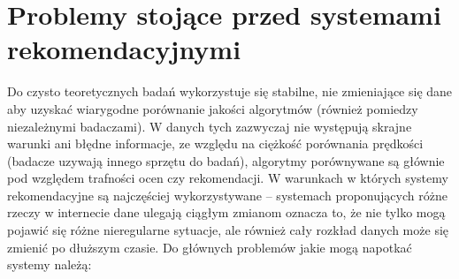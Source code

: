 \documentclass{pracamgr}
\begin{document}
  \section{Problemy stojące przed systemami rekomendacyjnymi}
   Do czysto teoretycznych badań wykorzystuje się stabilne, nie zmieniające się dane aby uzyskać wiarygodne porównanie jakości algorytmów
   (również pomiedzy niezależnymi badaczami). W danych tych zazwyczaj nie występują skrajne warunki ani błędne informacje,
   ze względu na ciężkość porównania prędkości (badacze uzywają innego sprzętu do badań),
   algorytmy porównywane są głównie pod względem trafności ocen czy rekomendacji.\newline
   W warunkach w których systemy rekomendacyjne są najczęściej wykorzystywane -- systemach proponujących różne rzeczy w internecie dane ulegają ciągłym zmianom
   oznacza to, że nie tylko mogą pojawić się różne nieregularne sytuacje, ale również cały rozkład danych może się zmienić po dłuższym czasie.
   Do głównych problemów jakie mogą napotkać systemy należą:
\end{document}

